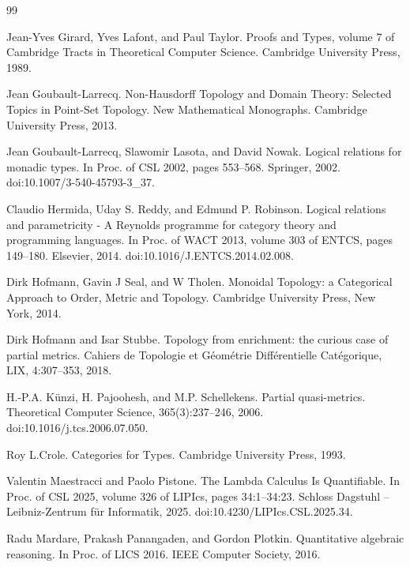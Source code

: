 \documentclass[10pt,a4paper]{amsart}
\begin{document}
\begin{thebibliography}{99}
\par\noindent  [18]  Jean-Yves Girard, Yves Lafont, and Paul Taylor.  Proofs and Types, volume 7 of Cambridge Tracts in Theoretical Computer Science.  Cambridge University Press, 1989.  
 
\par\noindent  [19]  Jean Goubault-Larrecq.  Non-Hausdorff Topology and Domain Theory: Selected Topics in Point-Set Topology.  New Mathematical Monographs. Cambridge University Press, 2013.  
 
\par\noindent  [20]  Jean Goubault-Larrecq, Slawomir Lasota, and David Nowak.  Logical relations for monadic types.  In Proc. of CSL 2002, pages 553–568. Springer, 2002.  doi:10.1007/3-540-45793-3\_37.  
 
\par\noindent  [21]  Claudio Hermida, Uday S. Reddy, and Edmund P. Robinson.  Logical relations and parametricity - A Reynolds programme for category theory and programming languages.  In Proc. of WACT 2013, volume 303 of ENTCS, pages 149–180. Elsevier, 2014.  doi:10.1016/J.ENTCS.2014.02.008.  
 
\par\noindent  [22]  Dirk Hofmann, Gavin J Seal, and W Tholen.  Monoidal Topology: a Categorical Approach to Order, Metric and Topology.  Cambridge University Press, New York, 2014.  
 
\par\noindent  [23]  Dirk Hofmann and Isar Stubbe.  Topology from enrichment: the curious case of partial metrics.  Cahiers de Topologie et Géométrie Différentielle Catégorique, LIX, 4:307–353, 2018.  
 
\par\noindent  [24]  H.-P.A. Künzi, H. Pajoohesh, and M.P. Schellekens.  Partial quasi-metrics.  Theoretical Computer Science, 365(3):237–246, 2006.  doi:10.1016/j.tcs.2006.07.050.  
 
\par\noindent  [25]  Roy L.Crole.  Categories for Types.  Cambridge University Press, 1993.  
 
\par\noindent  [26]  Valentin Maestracci and Paolo Pistone.  The Lambda Calculus Is Quantifiable.  In Proc. of CSL 2025, volume 326 of LIPIcs, pages 34:1–34:23. Schloss Dagstuhl – Leibniz-Zentrum für Informatik, 2025.  doi:10.4230/LIPIcs.CSL.2025.34.  
 
\par\noindent  [27]  Radu Mardare, Prakash Panangaden, and Gordon Plotkin.  Quantitative algebraic reasoning.  In Proc. of LICS 2016. IEEE Computer Society, 2016.  
 

\end{thebibliography}
\end{document}
